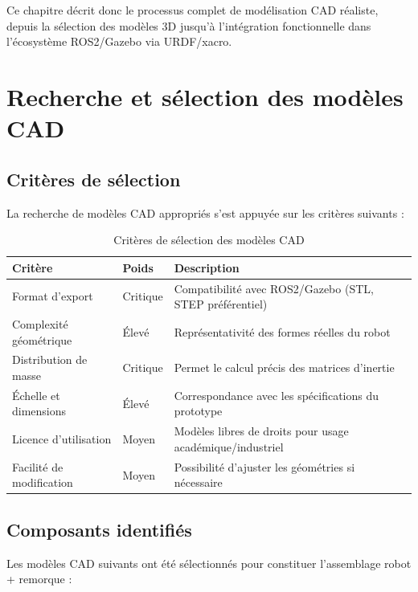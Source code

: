 \documentclass[a4paper,12pt]{report}
\begin{document}
Ce chapitre décrit donc le processus complet de modélisation CAD réaliste, depuis la sélection des modèles 3D jusqu'à l'intégration fonctionnelle dans l'écosystème ROS2/Gazebo via URDF/xacro.

\section{Recherche et sélection des modèles CAD}

\subsection{Critères de sélection}

La recherche de modèles CAD appropriés s'est appuyée sur les critères suivants :

\begin{table}[htbp]
\centering
\caption{Critères de sélection des modèles CAD}
\begin{tabular}{@{}llp{8cm}@{}}
\toprule
\textbf{Critère} & \textbf{Poids} & \textbf{Description} \\
\midrule
Format d'export & Critique & Compatibilité avec ROS2/Gazebo (STL, STEP préférentiel) \\
Complexité géométrique & Élevé & Représentativité des formes réelles du robot \\
Distribution de masse & Critique & Permet le calcul précis des matrices d'inertie \\
Échelle et dimensions & Élevé & Correspondance avec les spécifications du prototype \\
Licence d'utilisation & Moyen & Modèles libres de droits pour usage académique/industriel \\
Facilité de modification & Moyen & Possibilité d'ajuster les géométries si nécessaire \\
\bottomrule
\end{tabular}
\end{table}

\subsection{Composants identifiés}

Les modèles CAD suivants ont été sélectionnés pour constituer l'assemblage robot + remorque :
\end{document}

